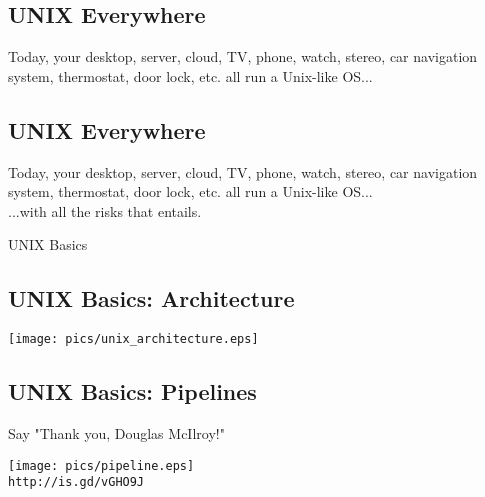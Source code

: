 \documentclass[xga]{xdvislides}
\begin{document}
\subsection{UNIX Everywhere}
\Hugesize
\vspace*{\fill}
\begin{center}
Today, your desktop, server, cloud, TV, phone, watch, stereo, car
navigation system, thermostat, door lock, etc. all run a Unix-like OS... \\
\end{center}
\vspace*{\fill}
\Normalsize

\subsection{UNIX Everywhere}
\Hugesize
\vspace*{\fill}
\begin{center}
Today, your desktop, server, cloud, TV, phone, watch, stereo, car
navigation system, thermostat, door lock, etc. all run a Unix-like OS... \\
\vspace{.5in}
...with all the risks that entails.
\end{center}
\vspace*{\fill}
\Normalsize

\pagebreak

\vspace*{\fill}
\begin{center}
  \Hugesize
    UNIX Basics
	\hspace*{5mm}\blueline\\ [1em]
  \Normalsize
\end{center}
\vspace*{\fill}

\subsection{UNIX Basics: Architecture}
\begin{center}
\texttt{[image: pics/unix\_architecture.eps]}
\end{center}

\subsection{UNIX Basics: Pipelines}
Say "Thank you, Douglas McIlroy!"
\begin{center}
\texttt{[image: pics/pipeline.eps]} \\
\verb+http://is.gd/vGHO9J+ \\
\end{center}
\end{document}
